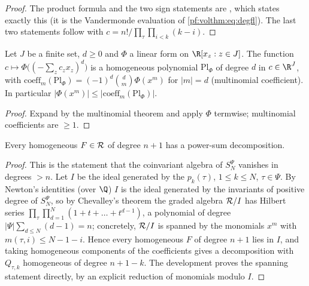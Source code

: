 \begin{proof}
The product formula and the two sign statements are
, which states exactly this (it is the
Vandermonde evaluation of \eqref{pf:volthm:eq:degfl}). The last two statements follow with
$c=n!/\prod_\tau\prod_{i<k}(k-i)$.
\end{proof}

\begin{lemma}[Polarisation]\label{pf:volthm:lem:polar}
Let $J$ be a finite set, $d\ge0$ and $\Phi$ a linear form on $\R[x_z:z\in J]$. The function
$c\mapsto\Phi\bigl((-\sum_zc_zx_z)^d\bigr)$ is a homogeneous polynomial $\mathrm{Pl}_\Phi$ of degree $d$ in
$c\in\R^J$, with $\mathrm{coeff}_m(\mathrm{Pl}_\Phi)=(-1)^d\binom{d}{m}\Phi(x^m)$ for $|m|=d$ (multinomial
coefficient). In particular $|\Phi(x^m)|\le|\mathrm{coeff}_m(\mathrm{Pl}_\Phi)|$.
\end{lemma}

\begin{proof}
Expand by the multinomial theorem and apply $\Phi$ termwise; multinomial coefficients are $\ge1$.
\end{proof}

\begin{lemma}\label{pf:volthm:lem:decomp}
Every homogeneous $F\in\mathcal{R}$ of degree $n+1$ has a power-sum decomposition.
\end{lemma}

\begin{proof}
This is the statement that the coinvariant algebra of $S_N^\Psi$ vanishes in degrees $>n$. Let $I$ be the
ideal generated by the $p_k(\tau)$, $1\le k\le N$, $\tau\in\Psi$. By Newton's identities (over $\Q$) $I$ is
the ideal generated by the invariants of positive degree of $S_N^\Psi$, so by Chevalley's theorem
\cite{Chevalley1955} the graded algebra $\mathcal{R}/I$ has Hilbert series
$\prod_\tau\prod_{d=1}^N(1+t+\dots+t^{d-1})$, a polynomial of degree $|\Psi|\sum_{d\le N}(d-1)=n$; concretely,
$\mathcal{R}/I$ is spanned by the monomials $x^m$ with $m(\tau,i)\le N-1-i$. Hence every homogeneous $F$ of
degree $n+1$ lies in $I$, and taking homogeneous components of the coefficients gives a decomposition with
$Q_{\tau,k}$ homogeneous of degree $n+1-k$. The development proves the spanning statement directly, by an explicit reduction of monomials
modulo $I$.
\end{proof}

